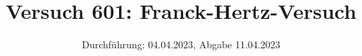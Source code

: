

\title{Versuch 601: Franck-Hertz-Versuch}
\date{Durchführung: 04.04.2023, Abgabe 11.04.2023}


\maketitle
\thispagestyle{empty} 
\tableofcontents
\newpage
\setcounter{page}{1}






\printbibliography
\newpage

%

